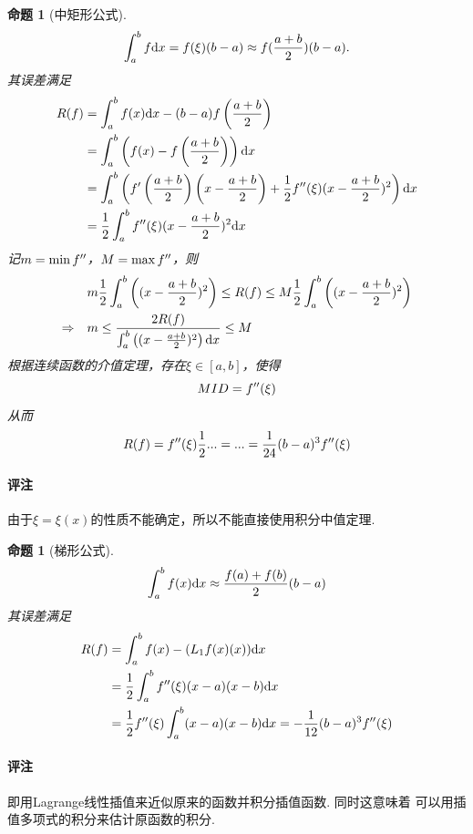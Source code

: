 \documentclass[12pt, a4paper]{article}
\theoremstyle{margin}
\newtheorem{pos}[thm]{命题}
\newcommand{\pr}{\prime}
\newcommand{\hp}{^\prime}
\newcommand{\f}{\mathnormal{f}}
\newcommand{\rd}{\mathrm{d}}
\newcommand{\remark}{\paragraph{评注}}
\begin{document}
  \begin{pos}[中矩形公式]
    \[
      \int_a^b\f\rd x = \f(\xi)(b-a)\approx \f(\frac{a+b}{2})(b-a).
    \]
    其误差满足
    \[\begin{split}
      R(\f) &= \int_a^b\f(x)\rd x - (b-a)\f\left(\frac{a+b}{2}\right)\\
            &= \int_a^b\left( \f(x)-\f\left(\frac{a+b}{2}\right) \right)\rd x \\
            &= \int_a^b\left( \f\hp\left(\frac{a+b}{2}\right)\left(x-\frac{a+b}{2}\right)
            + \frac{1}{2}\f^{\pr\pr}(\xi)(x-\frac{a+b}{2})^2 \right)\rd x \\
            &= \frac{1}{2}\int_a^b\f^{\pr\pr}(\xi)(x-\frac{a+b}{2})^2 \rd x
    \end{split}\]
    记$m=\min\f^{\pr\pr}$，$M=\max\f^{\pr\pr}$，则
    \[\begin{split}
      &m\frac{1}{2}\int_a^b\left( (x-\frac{a+b}{2})^2 \right) \le R(\f) \le M\frac{1}{2}\int_a^b\left( (x-\frac{a+b}{2})^2 \right) \\
      \Rightarrow\quad &m \le \frac{2R(\f)}{\int_a^b\left( (x-\frac{a+b}{2})^2 \right)\rd x} \le M
    \end{split}\]
    根据连续函数的介值定理，存在$\xi\in[a, b]$，使得
    \[
      MID = \f^{\pr\pr}(\xi)
    \]
    从而
    \[
      R(\f) = \f^{\pr\pr}(\xi)\frac{1}{2}... = ... = \frac{1}{24}(b-a)^3\f^{\pr\pr}(\xi)
    \]
  \end{pos}
  \remark
    由于$\xi = \xi(x)$的性质不能确定，所以不能直接使用积分中值定理.

  \begin{pos}[梯形公式]
    \[
      \int_a^b\f(x)\rd x \approx \frac{\f(a)+\f(b)}{2}(b-a)
    \]
    其误差满足
    \[\begin{split}
      R(\f) &= \int_a^b \f(x) - (L_1\f(x)(x))\rd x \\
            &= \frac{1}{2}\int_a^b\f^{\pr\pr}(\xi)(x-a)(x-b) \rd x\\
            &= \frac{1}{2}\f^{\pr\pr}(\xi)\int_a^b(x-a)(x-b)\rd x
          =  -\frac{1}{12}(b-a)^3\f^{\pr\pr}(\xi)
    \end{split}\]
  \end{pos}
  \remark
    即用Lagrange线性插值来近似原来的函数并积分插值函数. 同时这意味着
    可以用插值多项式的积分来估计原函数的积分.
\end{document}
